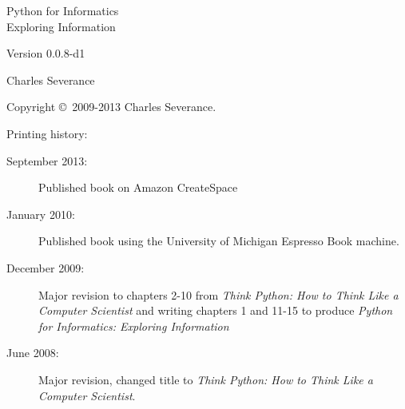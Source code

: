 \documentclass[11pt]{book}
\newcommand{\theversion}{0.0.8-d1}
\begin{document}
\frontmatter




\newtheorem{ex}{Exercise}[chapter]

\begin{latexonly}

\renewcommand{\blankpage}{\thispagestyle{empty} \quad \newpage}

\thispagestyle{empty}

\begin{flushright}
\vspace*{2.0in}

\begin{spacing}{3}
{\huge Python for Informatics}\\
{\Large Exploring Information}
\end{spacing}

\vspace{0.25in}

Version \theversion

\vspace{0.5in}


{\Large
Charles Severance\\
}

\vfill

\end{flushright}

\pagebreak
\thispagestyle{empty}

{\small
Copyright \copyright ~2009-2013 Charles Severance.


Printing history:

\begin{description}

\item[September 2013:] Published book on Amazon CreateSpace

\item[January 2010:] Published book using the University of 
Michigan Espresso Book machine.

\item[December 2009:] Major revision to chapters 2-10 from
\emph{Think Python: How to Think Like
a Computer Scientist}
and writing chapters 1 and 11-15 to
produce 
\emph{Python for Informatics: Exploring Information}

\item[June 2008:] Major revision, changed title to
\emph{Think Python: How to Think Like
a Computer Scientist}.


\end{description}}
\end{latexonly}
\end{document}
